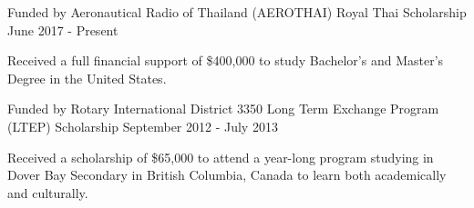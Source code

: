 
\begin{cventries}

  \cventry
    {Funded by Aeronautical Radio of Thailand (AEROTHAI)} %
    {Royal Thai Scholarship} %
    {June 2017 - Present} %
    {} 
    {
      \begin{cvitems} %
        \item {
          Received a full financial support of \$400,000 to study Bachelor’s and Master’s Degree in the United States.
        }
      \end{cvitems}
    }

  \cventry
    {Funded by Rotary International District 3350} %
    {Long Term Exchange Program (LTEP) Scholarship} %
    {September 2012 - July 2013} %
    {} 
    {
      \begin{cvitems} %
        \item {
          Received a scholarship of \$65,000 to attend a year-long program studying in Dover Bay Secondary in British Columbia, Canada to learn both academically and culturally.
        }
      \end{cvitems}
    }

\end{cventries}
